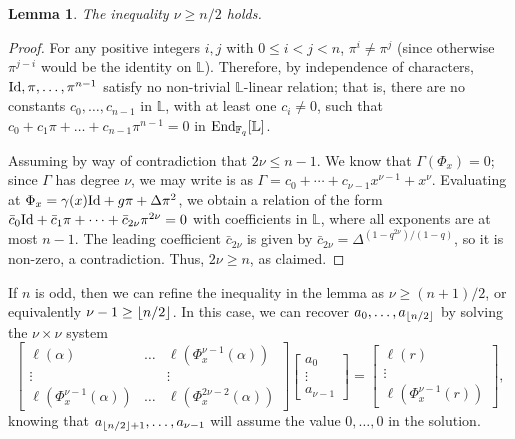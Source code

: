 \documentclass[sigconf]{acmart}
\newtheorem{lemma}{Lemma}
\newcommand{\F}{\mathbb{F}}
\renewcommand{\L}{\mathbb{L}}
\DeclarePairedDelimiter\floor{\lfloor}{\rfloor}
\begin{document}
\begin{lemma}
  The inequality $\nu\ge n/2$ holds.
\end{lemma}
\begin{proof}
   For any positive integers $i,j$ with $0 \le i < j < n$, $\pi^i \ne
   \pi^j$ (since otherwise $\pi^{j-i}$ would be the identity on
   $\L$). Therefore, by independence of characters, ${\rm Id}, \pi,
   \ldots, \pi^{n-1}$ satisfy no non-trivial $\L$-linear relation;
   that is, there are no constants $c_0, \ldots, c_{n-1}$ in $\L$,
   with at least one $c_i \neq 0$, such that $c_0 + c_1 \pi + \ldots +
   c_{n-1}\pi^{n-1}=0$ in ${\rm End}_{\F_q}[\L]$.

   Assuming by way of contradiction that $2\nu \le n-1$.  We know that
   $\Gamma(\Phi_x) = 0$; since $\Gamma$ has degree $\nu$, we may write
   is as $\Gamma = c_0 + \cdots + c_{\nu-1} x^{\nu-1} +
   x^\nu$. Evaluating at $\Phi_x = \gamma(x) {\rm Id} + g \pi + \Delta
   \pi^2$, we obtain a relation of the form $\bar c_0 {\rm Id} + \bar
   c_1 \pi + \cdots + \bar c_{2\nu} \pi^{2\nu} = 0$ with
   coefficients in $\L$, where all exponents are at most $n-1$. The
   leading coefficient $\bar c_{2\nu}$ is given by $\bar c_{2\nu} =
   \Delta^{(1-q^{2\nu})/(1-q)}$, so it is non-zero, a contradiction.
   Thus, $2\nu \ge n$, as claimed.
\end{proof}

If $n$ is odd, then we can refine the inequality in the lemma as $\nu
\ge (n+1)/2$, or equivalently $\nu-1 \ge \floor*{n/2}$. In this case,
we can recover $a_0,\dots,a_{\floor*{n/2}}$ by solving the $\nu \times \nu$ system
\[\begin{bmatrix}
   \ell(\alpha) & \ldots & \ell(\Phi_x^{\nu-1}(\alpha)) \\
    \vdots & & \vdots  \\ 
  \ell(\Phi_x^{\nu-1}(\alpha)) &  \ldots & \ell(\Phi_x^{2\nu-2}(\alpha))
\end{bmatrix} 
\begin{bmatrix} a_0  \\ \vdots \\ a_{\nu-1} \end{bmatrix} 
= 
\begin{bmatrix} \ell(r) \\ \vdots \\   \ell(\Phi_x^{\nu-1}(r)) \end{bmatrix}, \]
knowing that $a_{\floor*{n/2}+1},\dots,a_{\nu-1}$ will assume the
value $0,\dots,0$ in the solution.
\end{document}
